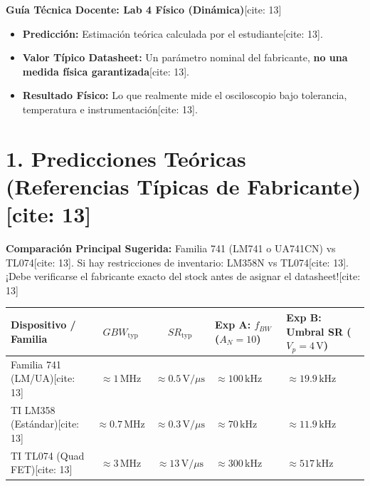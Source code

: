 \documentclass[11pt, a4paper]{article}
\begin{document}
\begin{center}
    \Large\textbf{\textcolor{ucbblue}{Guía Técnica Docente: Lab 4 Físico (Dinámica)}}[cite: 13]
\end{center}

\begin{tcolorbox}[colback=white, colframe=black, title=\textbf{Diferenciación Crítica de Conceptos[cite: 13]}]
    \begin{itemize}
        \item \textbf{Predicción:} Estimación teórica calculada por el estudiante[cite: 13].
        \item \textbf{Valor Típico Datasheet:} Un parámetro nominal del fabricante, \textbf{no una medida física garantizada}[cite: 13].
        \item \textbf{Resultado Físico:} Lo que realmente mide el osciloscopio bajo tolerancia, temperatura e instrumentación[cite: 13].
    \end{itemize}
\end{tcolorbox}

\section*{1. Predicciones Teóricas (Referencias Típicas de Fabricante)[cite: 13]}
\textbf{Comparación Principal Sugerida:} Familia 741 (LM741 o UA741CN) vs TL074[cite: 13]. Si hay restricciones de inventario: LM358N vs TL074[cite: 13]. ¡Debe verificarse el fabricante exacto del stock antes de asignar el datasheet![cite: 13]

\begin{table}[h!]
    \centering
    \footnotesize
    \renewcommand{\arraystretch}{1.3}
    \begin{tabularx}{\textwidth}{|l|c|c|X|X|}
    \hline
    \textbf{Dispositivo / Familia} & \textbf{$GBW_{\mathrm{typ}}$} & \textbf{$SR_{\mathrm{typ}}$} & \textbf{Exp A: $f_{BW}$ ($A_N=10$)} & \textbf{Exp B: Umbral SR ($V_p=4\,\text{V}$)} \\ \hline
    Familia 741 (LM/UA)[cite: 13] & $\approx 1\,\text{MHz}$ & $\approx 0.5\,\text{V}/\mu\text{s}$ & $\approx 100\,\text{kHz}$ & $\approx 19.9\,\text{kHz}$ \\ \hline
    TI LM358 (Estándar)[cite: 13] & $\approx 0.7\,\text{MHz}$ & $\approx 0.3\,\text{V}/\mu\text{s}$ & $\approx 70\,\text{kHz}$ & $\approx 11.9\,\text{kHz}$ \\ \hline
    TI TL074 (Quad FET)[cite: 13] & $\approx 3\,\text{MHz}$ & $\approx 13\,\text{V}/\mu\text{s}$ & $\approx 300\,\text{kHz}$ & $\approx 517\,\text{kHz}$ \\ \hline
    \end{tabularx}
\end{table}
\end{document}
